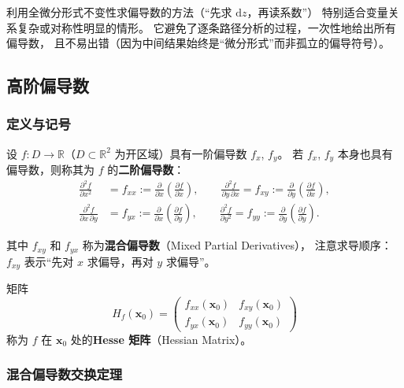 \documentclass[lang=cn,11pt]{elegantbook}
\begin{document}
\begin{remark}[全微分法的优势]
利用全微分形式不变性求偏导数的方法（“先求 $\mathrm{d}z$，再读系数”）
特别适合变量关系复杂或对称性明显的情形。
它避免了逐条路径分析的过程，一次性地给出所有偏导数，
且不易出错（因为中间结果始终是“微分形式”而非孤立的偏导符号）。
\end{remark}


\subsection{高阶偏导数}

\subsubsection*{定义与记号}

\begin{definition} \label{def:hessian}
设 $f:D\to\mathbb R$（$D\subset\mathbb R^2$ 为开区域）具有一阶偏导数 $f_x$, $f_y$。
若 $f_x$, $f_y$ 本身也具有偏导数，则称其为 $f$ 的\textbf{二阶偏导数}：
\begin{align*}
\frac{\partial^2 f}{\partial x^2}&=f_{xx}
  :=\frac{\partial}{\partial x}\!\left(\frac{\partial f}{\partial x}\right),\qquad
\frac{\partial^2 f}{\partial y\,\partial x}=f_{xy}
  :=\frac{\partial}{\partial y}\!\left(\frac{\partial f}{\partial x}\right),\\[8pt]
\frac{\partial^2 f}{\partial x\,\partial y}&=f_{yx}
  :=\frac{\partial}{\partial x}\!\left(\frac{\partial f}{\partial y}\right),\qquad
\frac{\partial^2 f}{\partial y^2}=f_{yy}
  :=\frac{\partial}{\partial y}\!\left(\frac{\partial f}{\partial y}\right).
\end{align*}

其中 $f_{xy}$ 和 $f_{yx}$ 称为\textbf{混合偏导数}（Mixed Partial Derivatives），
注意求导顺序：$f_{xy}$ 表示“先对 $x$ 求偏导，再对 $y$ 求偏导”。

矩阵
\[
H_f(\boldsymbol x_0)
=\begin{pmatrix}
f_{xx}(\boldsymbol x_0) & f_{xy}(\boldsymbol x_0)\\[6pt]
f_{yx}(\boldsymbol x_0) & f_{yy}(\boldsymbol x_0)
\end{pmatrix}
\]
称为 $f$ 在 $\boldsymbol x_0$ 处的\textbf{Hesse 矩阵}（Hessian Matrix）。
\end{definition}


\subsubsection*{混合偏导数交换定理}
\end{document}
